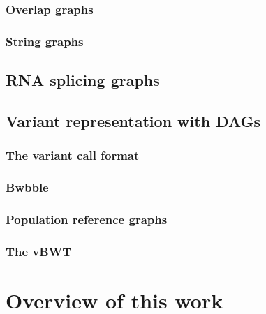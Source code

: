 \subsubsection{Overlap graphs}

\subsubsection{String graphs}

\subsection{RNA splicing graphs}

\subsection{Variant representation with DAGs}

\subsubsection{The variant call format}

\subsubsection{Bwbble}

\subsubsection{Population reference graphs}

\subsubsection{The vBWT}

\section{Overview of this work}

